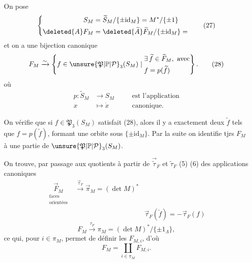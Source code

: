 On pose
\[
\left\{\begin{aligned}
S_M&=\widetilde S_M/\{\pm\mathrm{id}_M\}=M^*/\{\pm1\}\\
\deleted{A}F_M&=\deleted{\widetilde A}\widetilde F_M/\{\pm\mathrm{id}_M\}=
\end{aligned}\right.\tag*{(27)}
\]
et on a une bijection canonique
\[
F_M\xrightarrow{\sim}\left\{f\in\unsure{\mathfrak P|\mathbb P|\mathcal P}_3(S_M)\mid
\begin{aligned}&\exists\,\widetilde f\in\widetilde F_M,\ \text{avec}\\
&f=p(\widetilde f)\end{aligned}\right\}.\tag*{(28)}
\]
où
\[
\begin{aligned}p:\widetilde S_M&\longrightarrow S_M&\quad&\text{est l'application}\\
x&\longmapsto\dot x&&\text{canonique}.\end{aligned}\tag*{(29)}
\]

On vérifie  que si $f\in\mathfrak P_3(S_M)$
satisfait (28), alors il y a exactement deux
$\widetilde f$ tels que $f=p(\widetilde f)$, formant une orbite sous
$\{\pm\mathrm{id}_M\}$.
Par la suite on identifie tjrs $F_M$ à une
partie de $\unsure{\mathfrak P|\mathbb P|\mathcal P}_3(S_M)$.

On  trouve, par passage aux quotients
 à partir  de $\overrightarrow{\widetilde\tau}_F$  et $\widetilde\tau_F$ (5) (6)
des applications canoniques
\[
\begin{aligned}
\underset{\substack{\text{faces}\\\text{orientées}}}{\overrightarrow F_M}
&\xrightarrow{\overrightarrow\tau_F}\overrightarrow\pi_M=(\det M)^*\\
&&\overrightarrow\tau_F(\check f)=-\overrightarrow\tau_F(f)
\end{aligned}\tag*{(30)}
\]
\[
F_M\xrightarrow{\tau_F}\pi_M=(\det M)^*/\{\pm1_\Lambda\},\tag*{(31)}
\]
ce qui, pour $i\in\pi_M$, permet de définir
les $F_{M,i}$, d'où
\[
F_M=\coprod_{i\in\pi_M}F_{M,i}.\tag*{(32)}
\]

